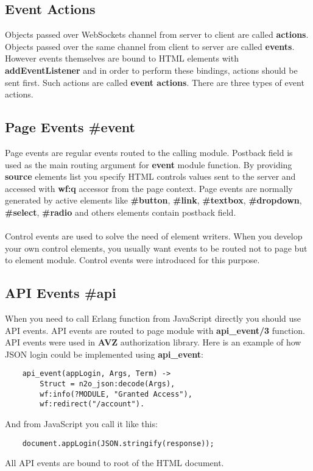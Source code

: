 \subsection*{Event Actions}
Objects passed over WebSockets channel from server to client are called {\bf actions}.
Objects passed over the same channel from client to server are called {\bf events}. However
events themselves are bound to HTML elements with {\bf addEventListener} and in order to perform these bindings,
actions should be sent first. Such actions are called {\bf event actions}. There are three types of event actions.

\subsection{Page Events {\bf \#event}}
Page events are regular events routed to the calling module. Postback field is used as the main
routing argument for {\bf event} module function. By providing {\bf source} elements list you specify
HTML controls values sent to the server and accessed with {\bf wf:q} accessor from the page context.
Page events are normally generated by active elements like {\bf \#button}, {\bf \#link},
{\bf \#textbox}, {\bf \#dropdown}, {\bf \#select}, {\bf \#radio} and others elements
contain postback field.

\paragraph{}
Control events are used to solve the need of element writers. When you develop your
own control elements, you usually want events to be routed not to page but to element module.
Control events were introduced for this purpose.

\subsection{API Events {\bf \#api}}
When you need to call Erlang function from JavaScript directly you should use API events.
API events are routed to page module with {\bf api\_event/3} function. API events were
used in {\bf AVZ} authorization library. Here is an example of how JSON login could be
implemented using {\bf api\_event}:

\vspace{1\baselineskip}
\begin{lstlisting}
    api_event(appLogin, Args, Term) ->
        Struct = n2o_json:decode(Args),
        wf:info(?MODULE, "Granted Access"),
        wf:redirect("/account").
\end{lstlisting}
\vspace{1\baselineskip}
And from JavaScript you call it like this:
\vspace{1\baselineskip}
\begin{lstlisting}
    document.appLogin(JSON.stringify(response));
\end{lstlisting}
\vspace{1\baselineskip}
All API events are bound to root of the HTML document.


